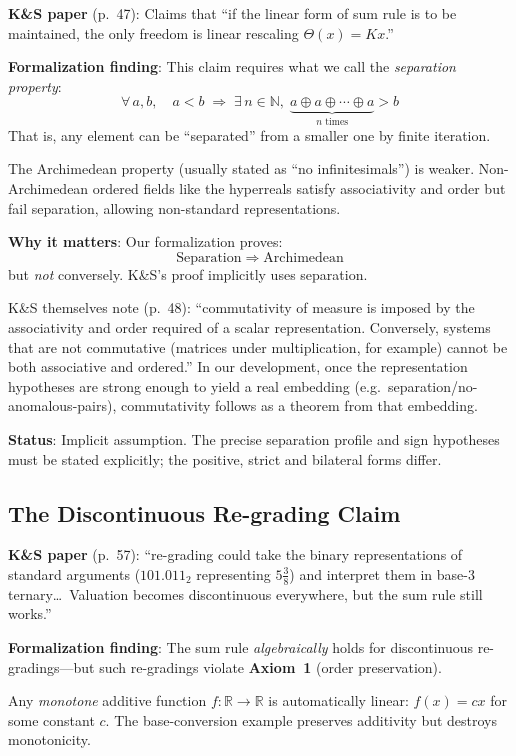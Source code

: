 \documentclass[11pt]{article}
\begin{document}
\textbf{K\&S paper} (p.~47): Claims that ``if the linear form of sum rule is to be
maintained, the only freedom is linear rescaling $\Theta(x) = Kx$.''

\textbf{Formalization finding}: This claim requires what we call the \emph{separation property}:
\[
\forall\, a, b,\quad a < b \;\Longrightarrow\; \exists\, n \in \mathbb{N},\;
\underbrace{a \oplus a \oplus \cdots \oplus a}_{n \text{ times}} > b
\]
That is, any element can be ``separated'' from a smaller one by finite iteration.

The Archimedean property (usually stated as ``no infinitesimals'') is weaker.
Non-Archimedean ordered fields like the hyperreals satisfy associativity and order
but fail separation, allowing non-standard representations.

\textbf{Why it matters}: Our formalization proves:
\[
\text{Separation} \;\Longrightarrow\; \text{Archimedean}
\]
but \emph{not} conversely. K\&S's proof implicitly uses separation.

K\&S themselves note (p.~48): ``commutativity of measure is imposed by the associativity
and order required of a scalar representation. Conversely, systems that are not
commutative (matrices under multiplication, for example) cannot be both associative
and ordered.'' In our development, once the representation hypotheses are strong enough to yield
a real embedding (e.g.\ separation/no-anomalous-pairs), commutativity follows as a theorem from that
embedding.

\textbf{Status}: Implicit assumption. The precise separation profile and sign hypotheses
must be stated explicitly; the positive, strict and bilateral forms differ.

\subsection{The Discontinuous Re-grading Claim}

\textbf{K\&S paper} (p.~57): ``re-grading could take the binary representations of
standard arguments ($101.011_2$ representing $5\frac{3}{8}$) and interpret them in
base-3 ternary\ldots\ Valuation becomes discontinuous everywhere, but the sum rule
still works.''

\textbf{Formalization finding}: The sum rule \emph{algebraically} holds for discontinuous
re-gradings---but such re-gradings violate \textbf{Axiom~1} (order preservation).

Any \emph{monotone} additive function $f: \mathbb{R} \to \mathbb{R}$ is automatically
linear: $f(x) = cx$ for some constant $c$. The base-conversion example preserves
additivity but destroys monotonicity.
\end{document}
